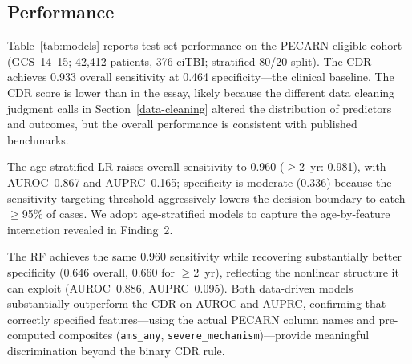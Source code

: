 \documentclass[10pt,letterpaper]{article}
\begin{document}
\subsection{Performance}
\label{model-performance}

Table~\ref{tab:models} reports test-set performance on the PECARN-eligible cohort
(GCS~14--15; 42,412 patients, 376 ciTBI; stratified 80/20 split).
The CDR achieves 0.933 overall sensitivity at 0.464 specificity---the clinical baseline.
The CDR score is lower than in the essay, likely because the different data cleaning judgment calls in Section~\ref{data-cleaning} altered the distribution of predictors and outcomes, but the overall performance is consistent with published benchmarks.

The age-stratified LR raises overall sensitivity to 0.960 ($\ge$2~yr: 0.981), with
AUROC~0.867 and AUPRC~0.165; specificity is moderate (0.336) because the sensitivity-targeting
threshold aggressively lowers the decision boundary to catch $\ge$95\% of cases.
We adopt age-stratified models to capture the age-by-feature interaction revealed in Finding~2.

The RF achieves the same 0.960 sensitivity while recovering substantially better specificity
(0.646 overall, 0.660 for $\ge$2~yr), reflecting the nonlinear structure it can exploit
(AUROC~0.886, AUPRC~0.095).
Both data-driven models substantially outperform the CDR on AUROC and AUPRC, confirming that
correctly specified features---using the actual PECARN column names and pre-computed composites
(\texttt{ams\_any}, \texttt{severe\_mechanism})---provide meaningful discrimination beyond
the binary CDR rule.
\end{document}
